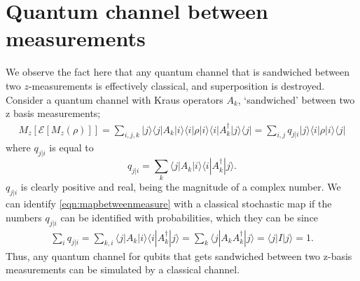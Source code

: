 \documentclass[aps,pra, twocolumn]{revtex4-1}
\begin{document}
\section{Quantum channel between measurements} \label{ap:classicalchannels} 
 We observe the fact here that any quantum channel that is sandwiched between two $z$-measurements is effectively classical, and superposition is destroyed. Consider a quantum channel with Kraus operators $A_k$, `sandwiched' between two z basis measurements;
\begin{align} 
M_z[\mathcal{E}[M_z(\rho)]]=  \sum_{i,j,k}|j \rangle \langle j |A_k|i \rangle \langle i |\rho |i \rangle \langle i | A_k^{\dagger}|j \rangle \langle j | 
=  \sum_{i,j}q_{j|i}|j \rangle \langle i |\rho |i \rangle \langle j |
\label{eqn:mapbetweenmeasure}
\end{align}
where $q_{j|i}$ is equal to
\begin{equation}
q_{j|i}=\sum_{k} \langle j |A_k|i \rangle \langle i | A_k^{\dagger}|j \rangle.
\end{equation}
$q_{j|i}$ is clearly positive and real, being the magnitude of a complex number. We can identify \ref{eqn:mapbetweenmeasure} with a classical stochastic map if the numbers $q_{j|i}$ can be identified with probabilities, which they can be since
\begin{align}
\sum_{i}q_{j|i}=\sum_{k,i}\langle j |A_k|i \rangle \langle i | A_k^{\dagger}|j \rangle=\sum_{k}\langle j |A_k A_k^{\dagger}|j \rangle=\langle j |I|j \rangle=1.
\end{align}
Thus, any quantum channel for qubits that gets sandwiched between two z-basis measurements can be simulated by a classical channel. 
\end{document}

